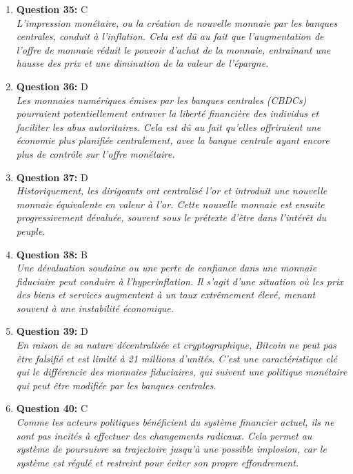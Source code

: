 \documentclass[12pt,a4paper]{article}
\begin{document}
\begin{enumerate}
\item \textbf{Question 35:} C
\\ \textit{L'impression monétaire, ou la création de nouvelle monnaie par les banques centrales, conduit à l'inflation. Cela est dû au fait que l'augmentation de l'offre de monnaie réduit le pouvoir d'achat de la monnaie, entraînant une hausse des prix et une diminution de la valeur de l'épargne.}

\item \textbf{Question 36:} D
\\ \textit{Les monnaies numériques émises par les banques centrales (CBDCs) pourraient potentiellement entraver la liberté financière des individus et faciliter les abus autoritaires. Cela est dû au fait qu'elles offriraient une économie plus planifiée centralement, avec la banque centrale ayant encore plus de contrôle sur l'offre monétaire.}

\item \textbf{Question 37:} D
\\ \textit{Historiquement, les dirigeants ont centralisé l'or et introduit une nouvelle monnaie équivalente en valeur à l'or. Cette nouvelle monnaie est ensuite progressivement dévaluée, souvent sous le prétexte d'être dans l'intérêt du peuple.}

\item \textbf{Question 38:} B
\\ \textit{Une dévaluation soudaine ou une perte de confiance dans une monnaie fiduciaire peut conduire à l'hyperinflation. Il s'agit d'une situation où les prix des biens et services augmentent à un taux extrêmement élevé, menant souvent à une instabilité économique.}

\item \textbf{Question 39:} D
\\ \textit{En raison de sa nature décentralisée et cryptographique, Bitcoin ne peut pas être falsifié et est limité à 21 millions d'unités. C'est une caractéristique clé qui le différencie des monnaies fiduciaires, qui suivent une politique monétaire qui peut être modifiée par les banques centrales.}

\item \textbf{Question 40:} C
\\ \textit{Comme les acteurs politiques bénéficient du système financier actuel, ils ne sont pas incités à effectuer des changements radicaux. Cela permet au système de poursuivre sa trajectoire jusqu'à une possible implosion, car le système est régulé et restreint pour éviter son propre effondrement.}


\end{enumerate}
\end{document}
